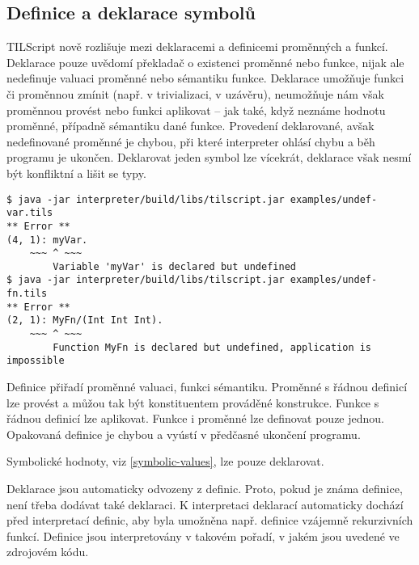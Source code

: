
\subsection{Definice a deklarace symbolů}

TILScript nově rozlišuje mezi deklaracemi a definicemi proměnných a funkcí. Deklarace pouze
uvědomí překladač o existenci proměnné nebo funkce, nijak ale nedefinuje valuaci proměnné nebo
sémantiku funkce. Deklarace umožňuje funkci či proměnnou zmínit (např. v trivializaci, v uzávěru),
neumožňuje nám však proměnnou provést nebo funkci aplikovat -- jak také, když neznáme hodnotu
proměnné, případně sémantiku dané funkce. Provedení deklarované, avšak nedefinované proměnné
je chybou, při které interpreter ohlásí chybu a běh programu je ukončen. Deklarovat jeden symbol
lze vícekrát, deklarace však nesmí být konfliktní a lišit se typy.

\begin{lstlisting}[caption={Hlášení chyby při chybějící definici}]
$ java -jar interpreter/build/libs/tilscript.jar examples/undef-var.tils
** Error **
(4, 1): myVar.
    ~~~ ^ ~~~
        Variable 'myVar' is declared but undefined
$ java -jar interpreter/build/libs/tilscript.jar examples/undef-fn.tils
** Error **
(2, 1): MyFn/(Int Int Int).
    ~~~ ^ ~~~
        Function MyFn is declared but undefined, application is impossible
\end{lstlisting}

Definice přiřadí proměnné valuaci, funkci sémantiku. Proměnné s řádnou definicí lze provést
a můžou tak být konstituentem prováděné konstrukce. Funkce s řádnou definicí lze aplikovat. Funkce
i proměnné lze definovat pouze jednou. Opakovaná definice je chybou a vyústí v předčasné ukončení
programu.

Symbolické hodnoty, viz \ref{symbolic-values}, lze pouze deklarovat.

Deklarace jsou automaticky odvozeny z definic. Proto, pokud je známa definice, není třeba dodávat
také deklaraci. K interpretaci deklarací automaticky dochází před interpretací definic, aby byla
umožněna např. definice vzájemně rekurzivních funkcí. Definice jsou interpretovány v takovém
pořadí, v jakém jsou uvedené ve zdrojovém kódu.

